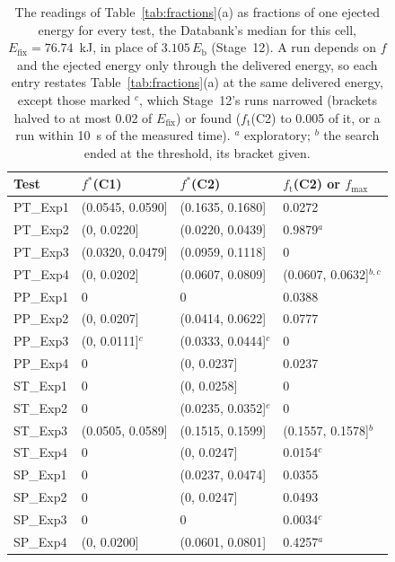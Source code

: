 \begin{table}[!tbp]
\centering
\scriptsize
\caption{The readings of Table~\ref{tab:fractions}(a) as fractions of one ejected energy for every test, the Databank's median for this cell, $E_\mathrm{fix}=76.74$~kJ, in place of $3.105\,E_\mathrm{b}$ (Stage~12). A run depends on $f$ and the ejected energy only through the delivered energy, so each entry restates Table~\ref{tab:fractions}(a) at the same delivered energy, except those marked $^{c}$, which Stage~12's runs narrowed (brackets halved to at most 0.02 of $E_\mathrm{fix}$) or found ($f_\mathrm{t}$(C2) to 0.005 of it, or a run within 10~s of the measured time). $^{a}$ exploratory; $^{b}$ the search ended at the threshold, its bracket given.}
\label{tab:fractions-fixed}
\begin{tabular}{llll}
\toprule
Test & $f^*$(C1) & $f^*$(C2) & $f_\mathrm{t}$(C2) or $f_\mathrm{max}$ \\
\midrule
PT\_Exp1 & (0.0545, 0.0590] & (0.1635, 0.1680] & 0.0272 \\
PT\_Exp2 & (0, 0.0220] & (0.0220, 0.0439] & 0.9879$^{a}$ \\
PT\_Exp3 & (0.0320, 0.0479] & (0.0959, 0.1118] & 0 \\
PT\_Exp4 & (0, 0.0202] & (0.0607, 0.0809] & (0.0607, 0.0632]$^{b,c}$ \\
PP\_Exp1 & 0 & 0 & 0.0388 \\
PP\_Exp2 & (0, 0.0207] & (0.0414, 0.0622] & 0.0777 \\
PP\_Exp3 & (0, 0.0111]$^{c}$ & (0.0333, 0.0444]$^{c}$ & 0 \\
PP\_Exp4 & 0 & (0, 0.0237] & 0.0237 \\
ST\_Exp1 & 0 & (0, 0.0258] & 0 \\
ST\_Exp2 & 0 & (0.0235, 0.0352]$^{c}$ & 0 \\
ST\_Exp3 & (0.0505, 0.0589] & (0.1515, 0.1599] & (0.1557, 0.1578]$^{b}$ \\
ST\_Exp4 & 0 & (0, 0.0247] & 0.0154$^{c}$ \\
SP\_Exp1 & 0 & (0.0237, 0.0474] & 0.0355 \\
SP\_Exp2 & 0 & (0, 0.0247] & 0.0493 \\
SP\_Exp3 & 0 & 0 & 0.0034$^{c}$ \\
SP\_Exp4 & (0, 0.0200] & (0.0601, 0.0801] & 0.4257$^{a}$ \\
\bottomrule
\end{tabular}
\end{table}
